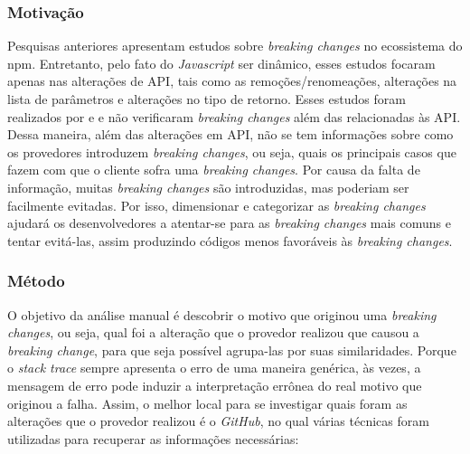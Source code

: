\subsubsection{Motivação}
\label{sec:qp2:motivation}
Pesquisas anteriores apresentam estudos sobre \textit{breaking changes} no ecossistema do \gls{npm}. Entretanto, pelo fato do \textit{Javascript} ser dinâmico, esses estudos focaram apenas nas alterações de \gls{API}, tais como as remoções/renomeações, alterações na lista de parâmetros e alterações no tipo de retorno. Esses estudos foram realizados por   e  e não verificaram \textit{breaking changes} além das relacionadas às \gls{API}. Dessa maneira, além das alterações em \gls{API}, não se tem informações sobre como os provedores introduzem \textit{breaking changes}, ou seja, quais os principais casos que fazem com que o cliente sofra uma \textit{breaking changes}. Por causa da falta de informação, muitas \textit{breaking changes} são introduzidas, mas poderiam ser facilmente evitadas. Por isso, dimensionar e categorizar as \textit{breaking changes} ajudará os desenvolvedores a atentar-se para as \textit{breaking changes} mais comuns e tentar evitá-las, assim produzindo códigos menos favoráveis às \textit{breaking changes}.

\subsubsection{Método}
\label{sec:qp2:approach}
O objetivo da análise manual é descobrir o motivo que originou uma \textit{breaking changes}, ou seja, qual foi a alteração que o provedor realizou que causou a \textit{breaking change}, para que seja possível agrupa-las por suas similaridades. Porque o \textit{stack trace} sempre apresenta o erro de uma maneira genérica, às vezes, a mensagem de erro pode induzir a interpretação errônea do real motivo que originou a falha. Assim, o melhor local para se investigar quais foram as alterações que o provedor realizou é o \textit{GitHub}, no qual várias técnicas foram utilizadas para recuperar as informações necessárias:

